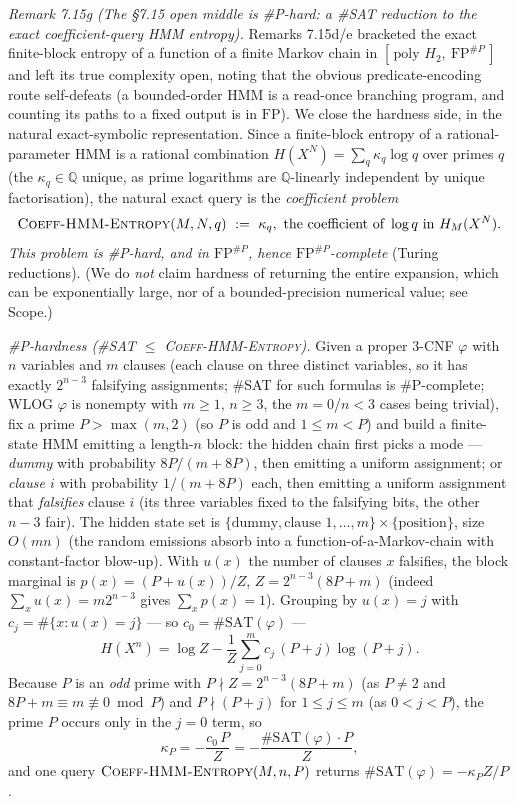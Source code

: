\documentclass[
]{article}
\begin{document}
\emph{Remark 7.15g (The §7.15 open middle is \#P-hard: a \#SAT reduction to the exact
coefficient-query HMM entropy).} Remarks 7.15d/e bracketed the exact finite-block entropy of a
function of a finite Markov chain in $[\,\text{poly }H_2,\ \mathrm{FP}^{\#P}\,]$ and left its
true complexity open, noting that the obvious predicate-encoding route self-defeats (a
bounded-order HMM is a read-once branching program, and counting its paths to a fixed output is
in $\mathrm{FP}$). We close the hardness side, in the natural exact-symbolic representation.
Since a finite-block entropy of a rational-parameter HMM is a rational combination
$H(X^N)=\sum_q\kappa_q\log q$ over primes $q$ (the $\kappa_q\in\mathbb Q$ unique, as prime
logarithms are $\mathbb Q$-linearly independent by unique factorisation), the natural exact query
is the \emph{coefficient problem}
\[
  \textsc{Coeff-HMM-Entropy}(M,N,q)\ :=\ \kappa_q,\ \text{the coefficient of }\log q\text{ in }H_M(X^N).
\]
\emph{This problem is \#P-hard, and in $\mathrm{FP}^{\#P}$, hence $\mathrm{FP}^{\#P}$-complete}
(Turing reductions). (We do \emph{not} claim hardness of returning the entire expansion, which
can be exponentially large, nor of a bounded-precision numerical value; see Scope.)

\emph{\#P-hardness (\#SAT $\le$ \textsc{Coeff-HMM-Entropy}).} Given a proper 3-CNF $\varphi$ with
$n$ variables and $m$ clauses (each clause on three distinct variables, so it has exactly
$2^{n-3}$ falsifying assignments; \#SAT for such formulas is \#P-complete; WLOG $\varphi$ is nonempty with
$m\ge1$, $n\ge3$, the $m{=}0$/$n{<}3$ cases being trivial), fix a prime
$P>\max(m,2)$ (so $P$ is odd and $1\le m<P$) and build a finite-state HMM emitting a length-$n$
block: the hidden chain first picks a mode --- \emph{dummy} with probability $8P/(m{+}8P)$, then
emitting a uniform assignment; or \emph{clause $i$} with probability $1/(m{+}8P)$ each, then
emitting a uniform assignment that \emph{falsifies} clause $i$ (its three variables fixed to the
falsifying bits, the other $n{-}3$ fair). The hidden state set is
$\{\text{dummy},\text{clause }1,\dots,m\}\times\{\text{position}\}$, size $O(mn)$ (the random
emissions absorb into a function-of-a-Markov-chain with constant-factor blow-up). With $u(x)$ the
number of clauses $x$ falsifies, the block marginal is $p(x)=(P+u(x))/Z$, $Z=2^{n-3}(8P+m)$
(indeed $\sum_x u(x)=m2^{n-3}$ gives $\sum_x p(x)=1$). Grouping by $u(x)=j$ with
$c_j=\#\{x:u(x)=j\}$ --- so $c_0=\#\mathrm{SAT}(\varphi)$ ---
\[
  H(X^n)=\log Z-\frac1Z\sum_{j=0}^{m}c_j\,(P+j)\log(P+j).
\]
Because $P$ is an \emph{odd} prime with $P\nmid Z=2^{n-3}(8P+m)$ (as $P\neq2$ and
$8P{+}m\equiv m\not\equiv0\bmod P$) and $P\nmid(P{+}j)$ for $1\le j\le m$ (as $0<j<P$), the prime
$P$ occurs only in the $j{=}0$ term, so
\[
  \kappa_P=-\frac{c_0\,P}{Z}=-\frac{\#\mathrm{SAT}(\varphi)\cdot P}{Z},
\]
and one query $\textsc{Coeff-HMM-Entropy}(M,n,P)$ returns $\#\mathrm{SAT}(\varphi)=-\kappa_P Z/P$.
\end{document}
